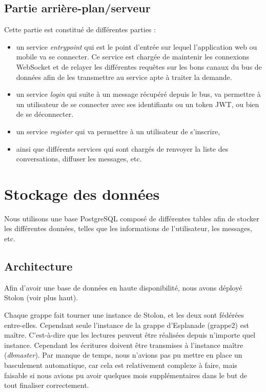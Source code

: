 \subsection{Partie arrière-plan/serveur}

Cette partie est constitué de différentes parties :

\begin{itemize}
\item
  un service \textit{entrypoint} qui est le point d'entrée sur lequel
  l'application web ou mobile va se connecter. Ce service est chargée de
  maintenir les connexions WebSocket et de relayer les différentes
  requêtes sur les bons canaux du bus de données afin de les transmettre
  au service apte à traiter la demande.
\item
  un service \textit{login} qui suite à un message récupéré depuis le bus,
  va permettre à un utilisateur de se connecter avec ses identifiants ou
  un token JWT, ou bien de se déconnecter.
\item
  un service \textit{register} qui va permettre à un utilisateur de
  s'inscrire,
\item
  ainsi que différents services qui sont chargés de renvoyer la liste
  des conversations, diffuser les messages, etc.
\end{itemize}

\section{Stockage des données}

Nous utilisons une base PostgreSQL composé de différentes tables afin de
stocker les différentes données, telles que les informations de
l'utilisateur, les messages, etc.


\subsection{Architecture}

Afin d'avoir une base de données en haute disponibilité, nous avons
déployé Stolon (voir plus haut).

Chaque grappe fait tourner une instance de Stolon, et les deux sont
fédérées entre-elles. Cependant seule l'instance de la grappe d'Esplanade
(grappe2) est maître. C'est-à-dire que les lectures peuvent être
réalisées depuis n'importe quel instance. Cependant les écritures
doivent être transmises à l'instance maître (\textit{dbmaster}). Par
manque de temps, nous n'avions pas pu mettre en place un basculement
automatique, car cela est relativement complexe à faire, mais faisable
si nous avions pu avoir quelques mois supplémentaires dans le but de
tout finaliser correctement.


